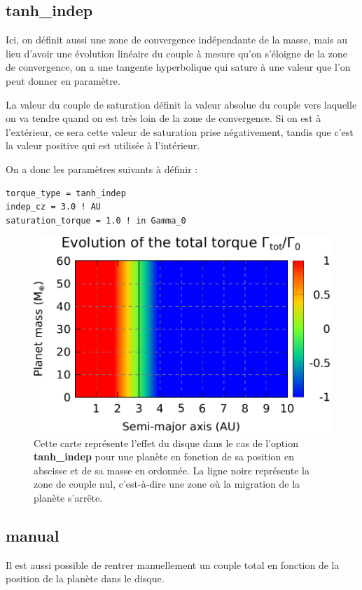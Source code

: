 \subsection{tanh\_indep}\label{sec:tanh_indep}
Ici, on définit aussi une zone de convergence indépendante de la masse, mais au lieu d'avoir une évolution linéaire du couple à mesure qu'on s'éloigne de la zone de convergence, on a une tangente hyperbolique qui sature à une valeur que l'on peut donner en paramètre. 

La valeur du couple de saturation définit la valeur absolue du couple vers laquelle on va tendre quand on est très loin de la zone de convergence. Si on est à l'extérieur, ce sera cette valeur de saturation prise négativement, tandis que c'est la valeur positive qui est utilisée à l'intérieur.

On a donc les paramètres suivants à définir : 
\begin{verbatim}
torque_type = tanh_indep
indep_cz = 3.0 ! AU
saturation_torque = 1.0 ! in Gamma_0
\end{verbatim}

\begin{figure}[htbp]
\centering
\includegraphics[width=0.65\linewidth]{figure/migration_map/tanh_indep.pdf}
\caption[Carte de migration correspondant à une zone de convergence \textbf{tanh\_indep}.]{Cette carte représente l'effet du
disque dans le cas de l'option \textbf{tanh\_indep} pour une planète en fonction de sa position en abscisse et de sa masse en
ordonnée. La ligne noire représente la zone de couple nul, c'est-à-dire une zone où la migration de la planète s'arrête.}
\end{figure}

\subsection{manual}
Il est aussi possible de rentrer manuellement un couple total en fonction de la position de la planète dans le disque. 

